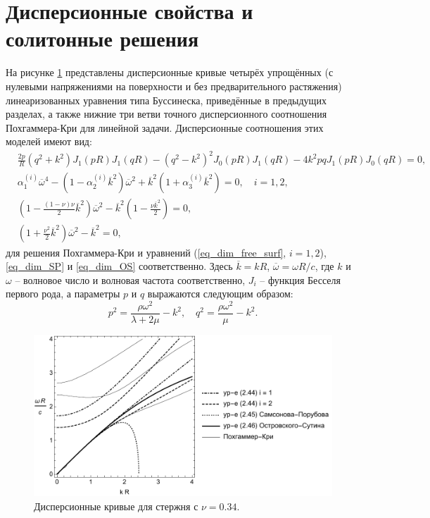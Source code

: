 \documentclass[12pt, a4paper]{report}
\begin{document}
\section{Дисперсионные свойства и солитонные решения}

На рисунке \ref{fig:disp} представлены дисперсионные кривые четырёх упрощённых (с нулевыми напряжениями на поверхности и без предварительного растяжения) линеаризованных уравнения типа Буссинеска, приведённые в предыдущих разделах, а также нижние три ветви точного дисперсионного соотношения Похгаммера-Кри для линейной задачи.
Дисперсионные соотношения этих моделей имеют вид:
\begin{align}
&\frac{2p}{R}\left(q^2 + k^2\right) J_1(pR) J_1(qR) - \left(q^2 - k^2\right)^2 J_0(pR) J_1(qR) -4k^2 p q J_1(pR) J_0(qR) = 0,\\
& \alpha_1^{(i)} \overline{\omega}^4 - \left(1 - \alpha_2^{(i)} \overline{k}^2\right) \overline{\omega}^2 + \overline{k}^2 \left(1 + \alpha_3^{(i)} \overline{k}^2 \right) = 0, \quad i = 1,2,\\
& \left(1 - \frac{(1-\nu)\nu}{2} \overline{k}^2\right) \overline{\omega}^2 - \overline{k}^2 \left(1 - \frac{\nu  \overline{k}^2}{2}\right) = 0,\\
& \left(1 + \frac{\nu^2}{2} \overline{k}^2\right) \overline{\omega}^2 - \overline{k}^2 = 0,
\end{align}
для решения Похгаммера-Кри и уравнений (\ref{eq_dim_free_surf}, $i=1,2$), \eqref{eq_dim_SP} и \eqref{eq_dim_OS} соответственно. Здесь $\overline{k} = k R$, $\overline{\omega} = \omega R / c$, где $k$ и $\omega$ -- волновое число и волновая частота соответственно, $J_i$ -- функция Бесселя первого рода, а параметры $p$ и $q$ выражаются следующим образом:
\begin{equation}
p^2 = \frac{\rho \omega^2}{\lambda + 2\mu} - k^2, \quad q^2 = \frac{\rho \omega^2}{\mu} - k^2.
\end{equation}

\begin{figure}[h]
	\centering
	\includegraphics[width=0.85\linewidth]{2_DispBlack}
	\caption{Дисперсионные кривые для стержня с $\nu = 0.34$.}
	\label{fig:disp}
\end{figure} 
\end{document}
